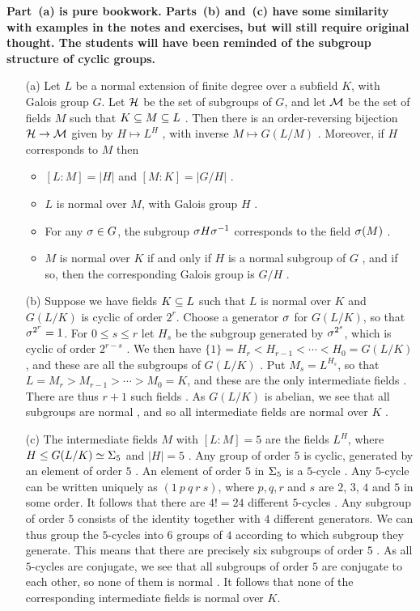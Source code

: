 \documentclass[a4paper]{article}
\begin{document}
\begin{solution}
 \textbf{Part~(a) is pure bookwork.  Parts~(b) and~(c) have some
  similarity with examples in the notes and exercises, but will still
  require original thought.  The students will have been reminded of
  the subgroup structure of cyclic groups.}
 \begin{itemize}
  \item[(a)] Let $L$ be a normal extension \mk of finite degree over a
   subfield $K$, with Galois group $G$.  Let $\mathcal{H}$ be the set of
   subgroups of $G$, and let $\mathcal{M}$ be the set of fields $M$ such that
   $K\subseteq M\subseteq L$ \mk.  Then there is an order-reversing \mk bijection
   $\mathcal{H}\to\mathcal{M}$ given by $H\mapsto L^H$ \mk, with inverse
   $M\mapsto G(L/M)$ \mk.  Moreover, if $H$ corresponds to $M$ then
   \begin{itemize}
    \item $[L:M]=|H|$ \mk and $[M:K]=|G/H|$ \mk.
    \item $L$ is normal over $M$, with Galois group $H$ \mk.
    \item For any $\sigma\in G$, the subgroup $\sigma H\sigma^{-1}$ corresponds
     to the field $\sigma(M)$ \mk.
    \item $M$ is normal over $K$ if and only if $H$ is a normal
     subgroup of $G$ \mk, and if so, then the corresponding Galois group
     is $G/H$ \mk.
   \end{itemize}
  \item[(b)] Suppose we have fields $K\subseteq L$ such that $L$ is normal
   over $K$ and $G(L/K)$ is cyclic of order $2^r$.  Choose a generator
   $\sigma$ for $G(L/K)$, so that $\sigma^{2^r}=1$.  For $0\leq s\leq r$ let
   $H_s$ be the subgroup generated by $\sigma^{2^s}$, which is cyclic
   of order $2^{r-s}$ \mk.  We then have
   $\{1\}=H_r<H_{r-1}<\dotsb<H_0=G(L/K)$, and these are all the
   subgroups of $G(L/K)$ \mk.  Put $M_s=L^{H_s}$, so that
   $L=M_r>M_{r-1}>\dotsb>M_0=K$, and these are the only intermediate
   fields \mk.  There are thus $r+1$ such fields \mk.  As $G(L/K)$ is
   abelian, we see that all subgroups are normal \mk, and so all intermediate
   fields are normal over $K$ \mk.
  \item[(c)] The intermediate fields $M$ with $[L:M]=5$ are the fields
   $L^H$, where $H\leq G(L/K)\simeq\Sigma_5$ and $|H|=5$ \mk.  Any group of
   order $5$ is cyclic, generated by an element of order $5$ \mk.  An
   element of order $5$ in $\Sigma_5$ is a $5$-cycle \mk.  Any $5$-cycle can
   be written uniquely as $(1~p~q~r~s)$, where $p,q,r$ and $s$ are
   $2$, $3$, $4$ and $5$ in some order.  It follows that there are
   $4!=24$ different $5$-cycles \mk.  Any subgroup of order $5$ consists
   of the identity together with $4$ different generators.  We can
   thus group the $5$-cycles into $6$ groups of $4$ according to which
   subgroup they generate.  This means that there are precisely six
   subgroups of order $5$ .  As all $5$-cycles are conjugate, we see
   that all subgroups of order $5$ are conjugate to each other, so
   none of them is normal \mk.  It follows that none of the corresponding
   intermediate fields is normal over $K$. \mk
 \end{itemize}
\end{solution}
\end{document}
